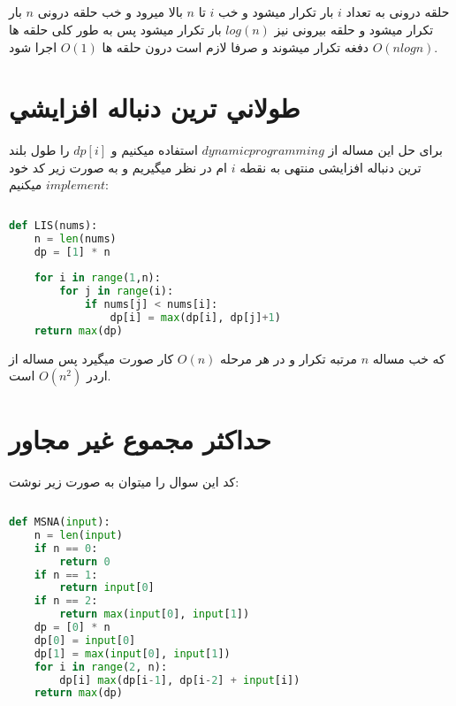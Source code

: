\documentclass[12pt]{article}
\begin{document}
\subsection{}
حلقه درونی به تعداد $i$ بار تکرار میشود و خب $i$ تا $n$ بالا میرود و خب حلقه درونی $n$ بار تکرار میشود و حلقه بیرونی نیز $log(n)$ بار تکرار میشود پس به طور کلی حلقه ها $O(nlogn)$ دفغه تکرار میشوند و صرفا لازم است درون حلقه ها $O(1)$ اجرا شود.

\section{طولاني ترين دنباله افزايشي}
برای حل این مساله از $dynamic programming$ استفاده میکنیم و $dp[i]$ را طول بلند ترین دنباله افزایشی منتهی به نقطه $i$ ام در نظر میگیریم و به صورت زیر کد خود $implement$ میکنیم:


\begin{lstlisting}[language=Python]
    
def LIS(nums):
    n = len(nums)
    dp = [1] * n
    
    for i in range(1,n):
        for j in range(i):
            if nums[j] < nums[i]:
                dp[i] = max(dp[i], dp[j]+1)
    return max(dp)
\end{lstlisting}

که خب مساله $n$ مرتبه تکرار و در هر مرحله $O(n)$ کار صورت میگیرد پس مساله از اردر $O(n^2)$ است.

\section{حداكثر مجموع غير مجاور}
کد این سوال را میتوان به صورت زیر نوشت:
\begin{lstlisting}[language=Python]
    
def MSNA(input):
    n = len(input)
    if n == 0:
        return 0
    if n == 1:
        return input[0]
    if n == 2:
        return max(input[0], input[1])
    dp = [0] * n
    dp[0] = input[0]
    dp[1] = max(input[0], input[1])
    for i in range(2, n):
        dp[i] max(dp[i-1], dp[i-2] + input[i])
    return max(dp)
\end{lstlisting}
\end{document}
